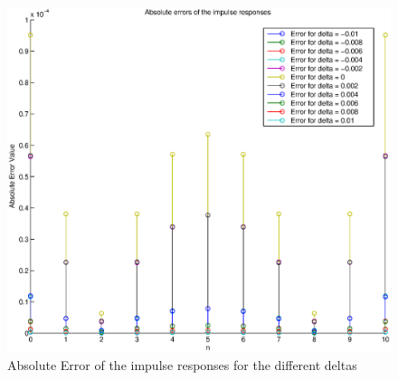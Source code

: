 \begin{figure}[h]
\centering
\includegraphics[width=\textwidth]{pics/fig5.eps}
\caption{Absolute Error of the impulse responses for the different deltas}
\label{fig:impz}
\end{figure}

